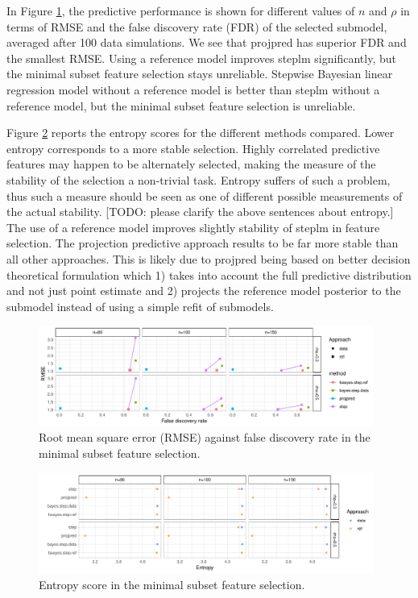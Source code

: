 \documentclass[american,]{article}
\theoremstyle{definition}
\begin{document}
In Figure \ref{fig:rmse_vs_fdr}, the predictive performance is shown
for different values of $n$ and $\rho$ in terms of RMSE and the false discovery rate (FDR) of the selected submodel,
averaged after 100 data simulations. We see that projpred has superior FDR and the
smallest RMSE. Using a reference model improves steplm significantly,
but the minimal subset feature selection stays unreliable. Stepwise
Bayesian linear regression model without a reference model is better
than steplm without a reference model, but the minimal subset feature
selection is unreliable.

Figure \ref{fig:entropy} reports the entropy scores for the different
methods compared. Lower entropy corresponds to a more stable
selection. Highly correlated predictive features may happen to be
alternately selected, making the measure of the stability of the
selection a non-trivial task. Entropy suffers of such a problem, thus
such a measure should be seen as one of different possible
measurements of the actual stability. 
[TODO: please clarify the above sentences about entropy.] 
The use of a reference model
improves slightly stability of steplm in feature selection. The
projection predictive approach results to be far more stable than all
other approaches. This is likely due to projpred being based on better
decision theoretical formulation which 1) takes into account the full
predictive distribution and not just point estimate and 2) projects
the reference model posterior to the submodel instead of using a
simple refit of submodels.

\begin{figure}[tp]
  \centering
  \includegraphics[width=0.98\textwidth]{graphics/rmse_vs_fdr_parallel.pdf}
  \caption{Root mean square error (RMSE) against false discovery rate in the minimal subset feature selection.}
  \label{fig:rmse_vs_fdr}
\end{figure}

\begin{figure}[tp]
  \centering
  \includegraphics[width=0.98\textwidth]{graphics/entropy_parallel.pdf}
  \caption{Entropy score in the minimal subset feature selection.}
  \label{fig:entropy}
\end{figure}
\end{document}
